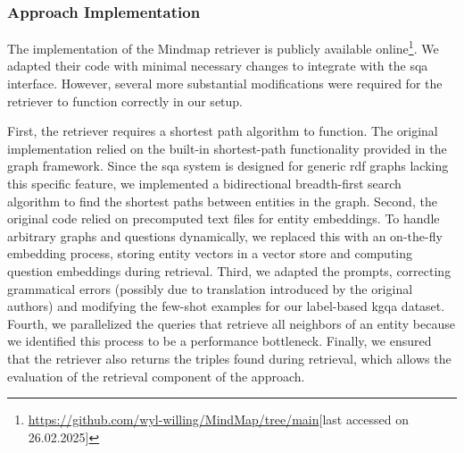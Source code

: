\subsubsection{Approach Implementation} 
The implementation of the Mindmap retriever is publicly available online\footnote{\url{https://github.com/wyl-willing/MindMap/tree/main}[last accessed on 26.02.2025]}. We adapted their code with minimal necessary changes to integrate with the \gls{sqa} interface. However, several more substantial modifications were required for the retriever to function correctly in our setup.

First, the retriever requires a shortest path algorithm to function. The original implementation relied on the built-in shortest-path functionality provided in the graph framework. Since the \gls{sqa} system is designed for generic \gls{rdf} graphs lacking this specific feature, we implemented a bidirectional breadth-first search algorithm to find the shortest paths between entities in the graph. Second, the original code relied on precomputed text files for entity embeddings. To handle arbitrary graphs and questions dynamically, we replaced this with an on-the-fly embedding process, storing entity vectors in a vector store and computing question embeddings during retrieval. Third, we adapted the prompts, correcting grammatical errors (possibly due to translation introduced by the original authors) and modifying the few-shot examples for our label-based \gls{kgqa} dataset. Fourth, we parallelized the queries that retrieve all neighbors of an entity because we identified this process to be a performance bottleneck. Finally, we ensured that the retriever also returns the triples found during retrieval, which allows the evaluation of the retrieval component of the approach.

